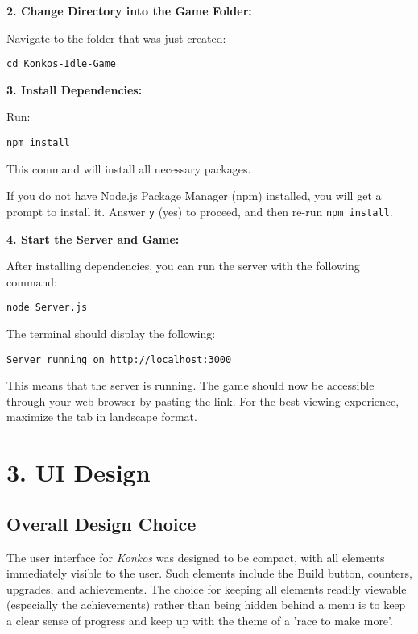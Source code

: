 \documentclass{article}
\begin{document}
\textbf{2. Change Directory into the Game Folder:}


Navigate to the folder that was just created:

\begin{verbatim}
cd Konkos-Idle-Game
\end{verbatim}

\textbf{3. Install Dependencies:}


Run:

\begin{verbatim}
npm install
\end{verbatim}

This command will install all necessary packages.

If you do not have Node.js Package Manager (npm) installed, you will get a prompt to install it. Answer \texttt{y} (yes) to proceed, and then re-run \texttt{npm install}.

\textbf{4. Start the Server and Game:}


After installing dependencies, you can run the server with the following command:

\begin{verbatim}
node Server.js
\end{verbatim}

The terminal should display the following:

\begin{verbatim}
Server running on http://localhost:3000
\end{verbatim}

This means that the server is running. The game should now be accessible through your web browser by pasting the link. For the best viewing experience, maximize the tab in landscape format. 



\section*{3. UI Design}
\subsection*{Overall Design Choice}
The user interface for \textit{Konkos} was designed to be compact, with all elements immediately visible to the user. Such elements include the Build button, counters, upgrades, and achievements. The choice for keeping all elements readily viewable (especially the achievements) rather than being hidden behind a menu is to keep a clear sense of progress and keep up with the theme of  a 'race to make more'. 
\end{document}
